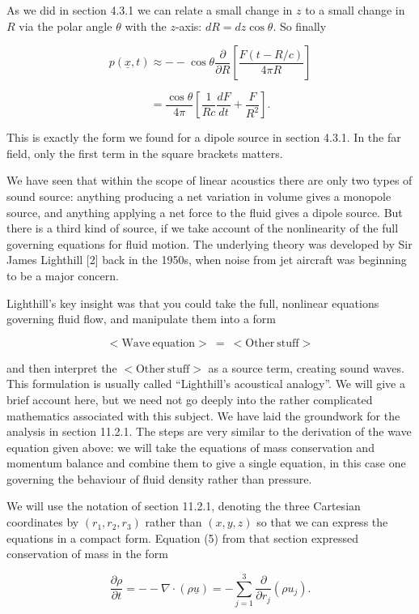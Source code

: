   As we did in section 4.3.1 we can relate a small change in $z$ to a small 
  change in $R$ via the polar angle $\theta$ with the $z$-axis: $dR=dz \cos 
  \theta$. So finally 

  $$p(\underline{x},t) \approx -- \cos \theta \dfrac{\partial}{\partial R} 
  \left[ \dfrac{F(t-R/c)}{4 \pi R} \right]$$ 

  $$ = \dfrac{\cos \theta}{4 \pi}\left[ \dfrac{1}{Rc} \dfrac{dF}{dt} + 
  \dfrac{F}{R^2} \right] . \tag{21}$$ 

  This is exactly the form we found for a dipole source in section 4.3.1. In 
  the far field, only the first term in the square brackets matters. 

  We have seen that within the scope of linear acoustics there are only two 
  types of sound source: anything producing a net variation in volume gives a 
  monopole source, and anything applying a net force to the fluid gives a 
  dipole source. But there is a third kind of source, if we take account of the 
  nonlinearity of the full governing equations for fluid motion. The underlying 
  theory was developed by Sir James Lighthill [2] back in the 1950s, when noise 
  from jet aircraft was beginning to be a major concern. 

  Lighthill's key insight was that you could take the full, nonlinear equations 
  governing fluid flow, and manipulate them into a form 

  $$<\mathrm{Wave~equation}>\mathrm{~}= \mathrm{~}<\mathrm{Other~stuff}>$$ 

  and then interpret the $<\mathrm{Other~stuff}>$ as a source term, creating 
  sound waves. This formulation is usually called ``Lighthill's acoustical 
  analogy''. We will give a brief account here, but we need not go deeply into 
  the rather complicated mathematics associated with this subject. We have laid 
  the groundwork for the analysis in section 11.2.1. The steps are very similar 
  to the derivation of the wave equation given above: we will take the 
  equations of mass conservation and momentum balance and combine them to give 
  a single equation, in this case one governing the behaviour of fluid density 
  rather than pressure. 

  We will use the notation of section 11.2.1, denoting the three Cartesian 
  coordinates by $(r_1,r_2,r_3)$ rather than $(x,y,z)$ so that we can express 
  the equations in a compact form. Equation (5) from that section expressed 
  conservation of mass in the form 

  $$\dfrac{\partial \rho}{\partial t} = -- \nabla \cdot (\rho \underline{u}) = 
  -\sum_{j=1}^3\dfrac{\partial}{\partial r_j} \left( \rho u_j \right) . 
  \tag{22}$$ 

